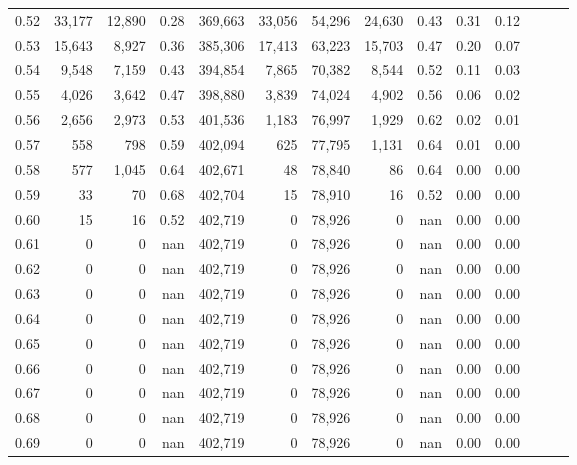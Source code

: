 \begin{tabular}{rrrrrrrrrrrrrr}
0.52 &  33,177 &  12,890 &  0.28 &  369,663 &   33,056 &  54,296 &  24,630 &  0.43 &  0.31 &      0.12 \\
0.53 &  15,643 &   8,927 &  0.36 &  385,306 &   17,413 &  63,223 &  15,703 &  0.47 &  0.20 &      0.07 \\
0.54 &   9,548 &   7,159 &  0.43 &  394,854 &    7,865 &  70,382 &   8,544 &  0.52 &  0.11 &      0.03 \\
0.55 &   4,026 &   3,642 &  0.47 &  398,880 &    3,839 &  74,024 &   4,902 &  0.56 &  0.06 &      0.02 \\
0.56 &   2,656 &   2,973 &  0.53 &  401,536 &    1,183 &  76,997 &   1,929 &  0.62 &  0.02 &      0.01 \\
0.57 &     558 &     798 &  0.59 &  402,094 &      625 &  77,795 &   1,131 &  0.64 &  0.01 &      0.00 \\
0.58 &     577 &   1,045 &  0.64 &  402,671 &       48 &  78,840 &      86 &  0.64 &  0.00 &      0.00 \\
0.59 &      33 &      70 &  0.68 &  402,704 &       15 &  78,910 &      16 &  0.52 &  0.00 &      0.00 \\
0.60 &      15 &      16 &  0.52 &  402,719 &        0 &  78,926 &       0 &   nan &  0.00 &      0.00 \\
0.61 &       0 &       0 &   nan &  402,719 &        0 &  78,926 &       0 &   nan &  0.00 &      0.00 \\
0.62 &       0 &       0 &   nan &  402,719 &        0 &  78,926 &       0 &   nan &  0.00 &      0.00 \\
0.63 &       0 &       0 &   nan &  402,719 &        0 &  78,926 &       0 &   nan &  0.00 &      0.00 \\
0.64 &       0 &       0 &   nan &  402,719 &        0 &  78,926 &       0 &   nan &  0.00 &      0.00 \\
0.65 &       0 &       0 &   nan &  402,719 &        0 &  78,926 &       0 &   nan &  0.00 &      0.00 \\
0.66 &       0 &       0 &   nan &  402,719 &        0 &  78,926 &       0 &   nan &  0.00 &      0.00 \\
0.67 &       0 &       0 &   nan &  402,719 &        0 &  78,926 &       0 &   nan &  0.00 &      0.00 \\
0.68 &       0 &       0 &   nan &  402,719 &        0 &  78,926 &       0 &   nan &  0.00 &      0.00 \\
0.69 &       0 &       0 &   nan &  402,719 &        0 &  78,926 &       0 &   nan &  0.00 &      0.00 \\

\end{tabular}
